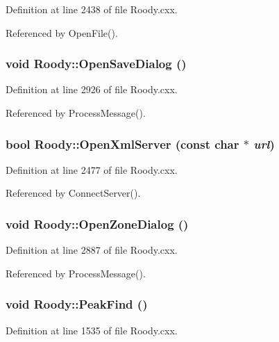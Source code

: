 Definition at line 2438 of file Roody.cxx.

Referenced by OpenFile().
\subsubsection[{OpenSaveDialog}]{\setlength{\rightskip}{0pt plus 5cm}void Roody::OpenSaveDialog ()\hspace{0.3cm}{\ttfamily  [private]}}\label{classRoody_a3bdfaf4086fcb5b9f39dab207b63a6b7}


Definition at line 2926 of file Roody.cxx.

Referenced by ProcessMessage().
\subsubsection[{OpenXmlServer}]{\setlength{\rightskip}{0pt plus 5cm}bool Roody::OpenXmlServer (const char $\ast$ {\em url})\hspace{0.3cm}{\ttfamily  [private]}}\label{classRoody_a8f835f115ffb995150946452b53fd793}


Definition at line 2477 of file Roody.cxx.

Referenced by ConnectServer().
\subsubsection[{OpenZoneDialog}]{\setlength{\rightskip}{0pt plus 5cm}void Roody::OpenZoneDialog ()\hspace{0.3cm}{\ttfamily  [private]}}\label{classRoody_af44aa6b92487b4440d55ece092706fb5}


Definition at line 2887 of file Roody.cxx.

Referenced by ProcessMessage().
\subsubsection[{PeakFind}]{\setlength{\rightskip}{0pt plus 5cm}void Roody::PeakFind ()}\label{classRoody_a9300e3861f317aeb8aea621d0d3787f0}


Definition at line 1535 of file Roody.cxx.
